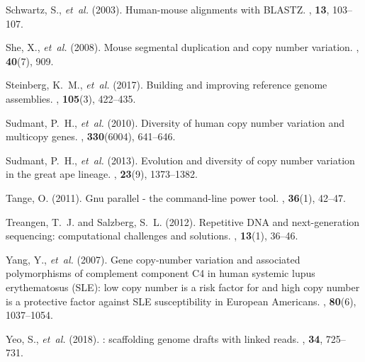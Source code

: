 \documentclass{article}
\begin{document}
\begin{thebibliography}{}
Schwartz, S., {\em et~al.} (2003).
\newblock Human-mouse alignments with {BLASTZ}.
, {\bf 13}, 103--107.

She, X., {\em et~al.} (2008).
\newblock Mouse segmental duplication and copy number variation.
, {\bf 40}(7), 909.

Steinberg, K.~M., {\em et~al.} (2017).
\newblock Building and improving reference genome assemblies.
, {\bf 105}(3), 422--435.

Sudmant, P.~H., {\em et~al.} (2010).
\newblock Diversity of human copy number variation and multicopy genes.
, {\bf 330}(6004), 641--646.

Sudmant, P.~H., {\em et~al.} (2013).
\newblock Evolution and diversity of copy number variation in the great ape
  lineage.
, {\bf 23}(9), 1373--1382.

Tange, O. (2011).
\newblock Gnu parallel - the command-line power tool.
, {\bf 36}(1), 42--47.

Treangen, T.~J. and Salzberg, S.~L. (2012).
\newblock Repetitive {DNA} and next-generation sequencing: computational
  challenges and solutions.
, {\bf 13}(1), 36--46.

Yang, Y., {\em et~al.} (2007).
\newblock Gene copy-number variation and associated polymorphisms of complement
  component {C4} in human systemic lupus erythematosus ({SLE}): low copy number
  is a risk factor for and high copy number is a protective factor against
  {SLE} susceptibility in {E}uropean {A}mericans.
, {\bf 80}(6), 1037--1054.

Yeo, S., {\em et~al.} (2018).
: scaffolding genome drafts with linked reads.
, {\bf 34}, 725--731.

\end{thebibliography}
\end{document}
